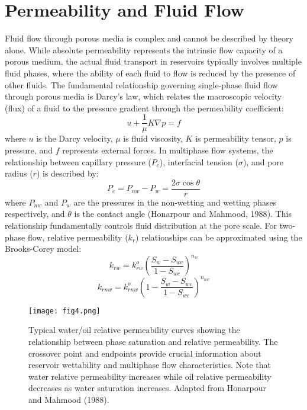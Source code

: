\documentclass[journal]{IEEEtran}
\begin{document}
\section{Permeability and Fluid Flow}
Fluid flow through porous media is complex and cannot be described by theory alone. While absolute permeability represents the intrinsic flow capacity of a porous medium, the actual fluid transport in reservoirs typically involves multiple fluid phases, where the ability of each fluid to flow is reduced by the presence of other fluids.
The fundamental relationship governing single-phase fluid flow through porous media is Darcy's law, which relates the macroscopic velocity (flux) of a fluid to the pressure gradient through the permeability coefficient:
\begin{equation}
u + \frac{1}{\mu} K\nabla p = f
\end{equation}
where $u$ is the Darcy velocity, $\mu$ is fluid viscosity, $K$ is permeability tensor, $p$ is pressure, and $f$ represents external forces.
In multiphase flow systems, the relationship between capillary pressure ($P_c$), interfacial tension ($\sigma$), and pore radius ($r$) is described by:
\begin{equation}
P_c = P_{nw} - P_w = \frac{2\sigma\cos\theta}{r}
\end{equation}
where $P_{nw}$ and $P_w$ are the pressures in the non-wetting and wetting phases respectively, and $\theta$ is the contact angle (Honarpour and Mahmood, 1988\cite{honarpour_relative-permeability_1988}). This relationship fundamentally controls fluid distribution at the pore scale.
For two-phase flow, relative permeability ($k_r$) relationships can be approximated using the Brooks-Corey model:
\begin{equation}
k_{rw} = k_{rw}^o(\frac{S_w - S_{wc}}{1 - S_{wc}})^{n_w}
\end{equation}
\begin{equation}
k_{rnw} = k_{rnw}^o(1 - \frac{S_w - S_{wc}}{1 - S_{wc}})^{n_{nw}}
\end{equation}

\begin{figure}[t]
    \centering
    \texttt{[image: fig4.png]}
    \caption{Typical water/oil relative permeability curves showing the relationship between phase saturation and relative permeability. The crossover point and endpoints provide crucial information about reservoir wettability and multiphase flow characteristics. Note that water relative permeability increases while oil relative permeability decreases as water saturation increases. Adapted from Honarpour and Mahmood (1988).}
    \label{fig:rel_perm}
    \end{figure}
\end{document}
